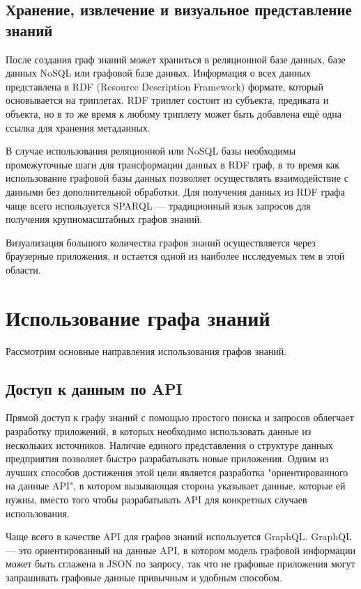 \subsection{Хранение, извлечение и визуальное представление знаний}

После создания граф знаний может храниться в реляционной базе данных, базе данных NoSQL или графовой базе данных. Информация о всех данных
представлена в RDF (Resource Description Framework) формате, который основывается на триплетах. RDF триплет состоит из субъекта, предиката и
объекта, но в то же время к любому триплету может быть добавлена ещё одна ссылка для хранения метаданных.

В случае использования реляционной или NoSQL базы необходимы промежуточные шаги для трансформации данных в RDF граф, в то время как
использование графовой базы данных позволяет осуществлять взаимодействие с данными без дополнительной обработки. Для получения данных из RDF
графа чаще всего используется SPARQL — традиционный язык запросов для получения крупномасштабных графов знаний.

Визуализация большого количества графов знаний осуществляется через браузерные приложения, и остается одной из наиболее исследуемых тем в этой области.


\section{Использование графа знаний}

Рассмотрим основные направления использования графов знаний.

\subsection{Доступ к данным по API}

Прямой доступ к графу знаний с помощью простого поиска и запросов облегчает разработку приложений, в которых необходимо использовать данные
из нескольких источников. Наличие единого представления о структуре данных предприятия позволяет быстро разрабатывать новые приложения.
Одним из лучших способов достижения этой цели является разработка "ориентированного на данные API", в котором вызывающая сторона указывает
данные, которые ей нужны, вместо того чтобы разрабатывать API для конкретных случаев использования.

Чаще всего в качестве API для графов знаний используется GraphQL. GraphQL — это ориентированный на данные API, в котором модель графовой
информации может быть сглажена в JSON по запросу, так что не графовые приложения могут запрашивать графовые данные привычным и удобным способом.

